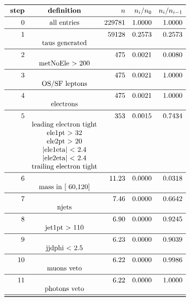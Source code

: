 \documentclass[11pt,a4paper]{article}
\begin{document}
\begin{table}
\caption{\emph{Entries after each selection step, normalised to 5.00 $fb^{-1}$; n is the number of entries after the i-th selection step; Note that cuts on second jet are applied only if a second jet exists with $p_t$ > 30\,GeV.}}
\[
\begin{array}{rcrrr}
\toprule
\ \textbf{step}& \textbf{definition}  & n  &  n_i/n_0 & n_i/n_{i-1}  \\ 
\midrule
 0  & \text{all entries} & 229781 & 1.0000 & 1.0000 \\
\midrule
 1  & &  59128 & 0.2573 & 0.2573 \\
& \text{taus generated} & & & \\
\midrule
 2  & &    475 & 0.0021 & 0.0080 \\
& \text{metNoEle > 200} & & & \\
\midrule
 3  & &    475 & 0.0021 & 1.0000 \\
& \text{OS/SF leptons} & & & \\
\midrule
 4  & &    475 & 0.0021 & 1.0000 \\
& \text{electrons} & & & \\
\midrule
 5  & &    353 & 0.0015 & 0.7434 \\
& \text{leading electron tight} & & & \\
& \text{ele1pt >  32} & & & \\
& \text{ele2pt >  20} & & & \\
& \text{|ele1eta| < 2.4} & & & \\
& \text{|ele2eta| < 2.4} & & & \\
& \text{trailing electron tight} & & & \\
\midrule
 6  & &  11.23 & 0.0000 & 0.0318 \\
& \text{mass in [ 60,120]} & & & \\
\midrule
 7  & &   7.46 & 0.0000 & 0.6642 \\
& \text{njets} & & & \\
\midrule
 8  & &   6.90 & 0.0000 & 0.9245 \\
& \text{jet1pt >  110} & & & \\
\midrule
 9  & &   6.23 & 0.0000 & 0.9039 \\
& \text{jjdphi < 2.5} & & & \\
\midrule
 10  & &   6.22 & 0.0000 & 0.9986 \\
& \text{muons veto} & & & \\
\midrule
 11  & &   6.22 & 0.0000 & 1.0000 \\
& \text{photons veto} & & & \\
\midrule
\bottomrule
\end{array}
\]
\end{table}
\end{document}
